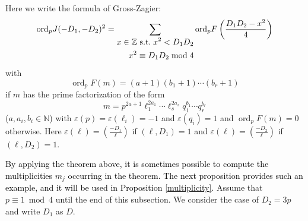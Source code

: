 \documentclass[a4paper, 11pt]{article}
\theoremstyle{plain}
\newcommand{\?}{\textcolor{red}{??}}
\newcommand{\Z}{\mathbb{Z}}
\newcommand{\N}{\mathbb{N}}
\newcommand{\ord}{{\operatorname{ord}}}
\begin{document}
Here we write the formula of Gross-Zagier:
\[
\ord_p J(-D_1, -D_2)^2 = 
\sum_{\begin{split}
    x\in\Z \text{ s.t.\;} x^2 < D_1D_2\\
    x^2\equiv D_1D_2 \bmod 4
\end{split}}
\ord_p F\left(\frac{D_1D_2-x^2}{4}\right)
\]
with 
\[
\ord_p F(m) = (a+1)(b_1+1)\cdots (b_r+1)
\]
if $m$ has the prime factorization of the form
\[
m=p^{2a+1}\ell_1^{2a_1}\cdots \ell_s^{2a_s}q_1^{b_1}\cdots q_r^{b_r}
\]
($a,a_i,b_i\in\N$)
with $\varepsilon(p)=\varepsilon(\ell_i)=-1$
and $\varepsilon(q_i)=1$
and $\ord_p F(m) = 0$ otherwise. Here
$\displaystyle \varepsilon(\ell) = \left(\frac{-D_1}{\ell}\right)$
if $(\ell,D_1)=1$ and $\displaystyle \varepsilon(\ell) = \left(\frac{-D_2}{\ell}\right)$
if $(\ell,D_2)=1$.

\textcolor{black}{By applying the theorem above, it is sometimes possible to compute the multiplicities $m_j$ occurring in the theorem. The next proposition provides such an example, and it will be used in Proposition \ref{multiplicity}.} Assume that $p\equiv 1 \bmod 4$ until the end of this subsection. We consider the case of $D_2=3p$ and write $D_1$ as $D$. 
\end{document}
